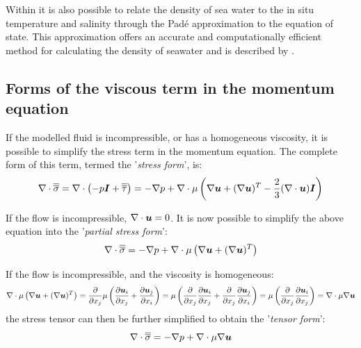 Within \fluidity it is also possible to relate the density of sea water to the in situ temperature and salinity through the Pad{\'e} approximation to the equation of state. This approximation offers an accurate and computationally efficient method for calculating the density of seawater and is described by \citet{mcdougall2003}.


\subsection{Forms of the viscous term in the momentum equation} \label{sec:ViscosityTerms}

If the modelled fluid is incompressible, or has a homogeneous viscosity, it is possible to simplify the stress term in the momentum equation. The complete form of this term, termed the '\emph{stress form}', is:
\begin{equation}
\nabla\cdot\overline{\overline{\sigma}} = \nabla\cdot\left(-p {\mbox{\boldmath$I$}} + \overline{\overline{\tau}}\right) = - \nabla p + 
\nabla\cdot\mu\left(\nabla{\mbox{\boldmath$u$}} + (\nabla{\mbox{\boldmath$u$}})^T - \frac{2}{3}(\nabla\cdot{\mbox{\boldmath$u$}}){\mbox{\boldmath$I$}} \right)
\end{equation}

If the flow is incompressible, $\nabla\cdot{\mbox{\boldmath$u$}}=0$. It is now possible to simplify the above equation into the '\emph{partial stress form}':
\begin{equation}
\nabla\cdot\overline{\overline{\sigma}} = - \nabla p + 
\nabla\cdot\mu\left(\nabla{\mbox{\boldmath$u$}} + (\nabla{\mbox{\boldmath$u$}})^T\right)
\end{equation}

If the flow is incompressible, and the viscosity is homogeneous:
\begin{equation}
\nabla\cdot\mu\left(\nabla{\mbox{\boldmath$u$}} + (\nabla{\mbox{\boldmath$u$}})^T\right) = \frac{\partial}{\partial x_j} \mu \left(\frac{\partial {\mbox{\boldmath$u$}}_i}{\partial x_j} + \frac{\partial {\mbox{\boldmath$u$}}_j}{\partial x_i}\right) = \mu \left(\frac{\partial}{\partial x_j}\frac{\partial {\mbox{\boldmath$u$}}_i}{\partial x_j} + \frac{\partial}{\partial x_j}\frac{\partial {\mbox{\boldmath$u$}}_j}{\partial x_i}\right) = \mu \left(\frac{\partial}{\partial x_j}\frac{\partial {\mbox{\boldmath$u$}}_i}{\partial x_j}\right) = \nabla\cdot\mu\nabla{\mbox{\boldmath$u$}}
\end{equation}
the stress tensor can then be further simplified to obtain the '\emph{tensor form}':
\begin{equation}
\nabla\cdot\overline{\overline{\sigma}} = - \nabla p + \nabla\cdot\mu\nabla{\mbox{\boldmath$u$}}
\end{equation}

